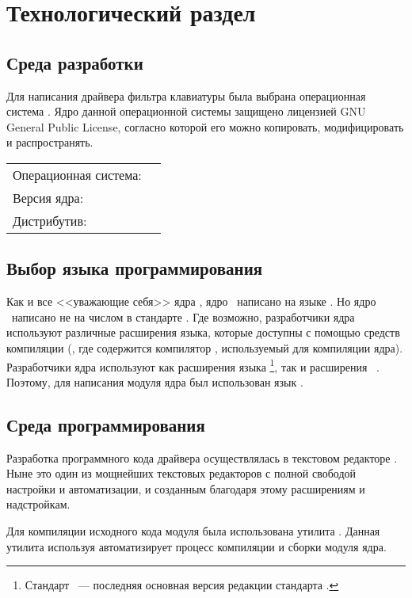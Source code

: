 \section{Технологический раздел}

\subsection{Среда разработки}
Для написания драйвера фильтра клавиатуры была выбрана операционная система \gnulinux.
Ядро данной операционной системы защищено лицензией GNU General Public License, согласно
которой его можно копировать, модифицировать и распространять.
\begin{flushleft}
	\begin{tabular}{ll}
		Операционная система:&\gnulinux\\
		Версия ядра:&\linuxv\\
		Дистрибутив:&\archlinux
	\end{tabular}
\end{flushleft}

\subsection{Выбор языка программирования}
Как и все <<уважающие себя>> ядра \unix, ядро \linux\ написано на языке .
Но ядро \linux\ написано не на числом  в стандарте . Где возможно,
разработчики ядра используют различные расширения языка, которые доступны
с помощью средств компиляции  (, где содержится
компилятор , используемый для компиляции ядра).
\newpar
Разработчики ядра используют как расширения языка \footnote{Стандарт
~--- последняя основная версия редакции стандарта .}, так и
расширения \ \cite{Love}.
\newpar
Поэтому, для написания модуля ядра был использован язык .

\subsection{Среда программирования}
Разработка программного кода драйвера осуществлялась в текстовом редакторе .
Ныне это один из мощнейших текстовых редакторов с полной свободой настройки 
и автоматизации, и созданным благодаря этому расширениям и надстройкам.

\newpar
Для компиляции исходного кода модуля была использована утилита .
Данная утилита используя  автоматизирует процесс компиляции и сборки
модуля ядра.
\newpar

